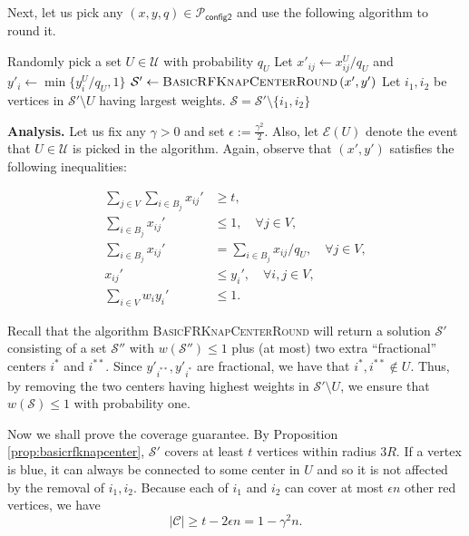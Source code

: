 \documentclass[a4paper,11pt]{article}
\newcommand{\C}{\mathcal{C}}
\renewcommand{\S}{\mathcal{S}}
\newcommand{\U}{\mathcal{U}}
\renewcommand{\P}{\mathcal{P}}
\newcommand{\e}{\mathcal{E}}
\begin{document}
Next, let us pick any $(x,y,q) \in \P_\textsf{config2}$ and use the following algorithm to round it. 

\begin{algorithm}[h]
\caption{$\textsc{FRKnapCenterRound2}\left(x,y,q \right)$}
\begin{algorithmic}[1]
\STATE Randomly pick a set $U \in \U$ with probability $q_U$
\STATE Let $x'_{ij} \gets x^{U}_{ij}/q_U$ and $y'_i \gets \min\{y_i^U/q_U, 1\}$
\STATE $\S' \gets \textsc{BasicRFKnapCenterRound}\left(x', y' \right)$
\STATE Let $i_1, i_2$ be vertices in $\S' \setminus U$ having largest weights.
\RETURN $\S = \S' \setminus \{i_1, i_2\}$
\end{algorithmic} 
\end{algorithm}

\bigskip \noindent \textbf{Analysis.} Let us fix any $\gamma > 0$ and set $\epsilon := \frac{\gamma^2}{2}$. Also, let $\e(U)$ denote the event that $U \in \U$ is picked in the algorithm. Again, observe that $(x', y')$ satisfies the following inequalities:

\begin{align*}
	\sum_{j \in V} \sum_{i \in B_j} x_{ij}' &\geq t, \\
	\sum_{i \in B_j} x_{ij}' &\leq 1, \quad \forall j \in V, \\
	\sum_{i \in B_j} x_{ij}' &= \sum_{i \in B_j} x_{ij} / q_U, \quad  \forall j \in V, \\
	x_{ij}' &\leq y_i', \quad \forall i,j \in V, \\
	\sum_{i \in V} w_iy_i' &\leq 1.
\end{align*}


Recall that the algorithm \textsc{BasicFRKnapCenterRound} will return a solution $\S'$ consisting of a set $\S''$ with $w(\S'') \leq 1$ plus (at most) two extra ``fractional'' centers $i^*$ and $i^{**}$. Since $y'_{i^{**}}, y'_{i^*}$ are  fractional, we have that $i^*, i^{**} \notin U$. Thus, by removing the two centers having highest weights in $\S' \setminus U$, we ensure that $w(\S) \leq 1$ with probability one.

Now we shall prove the coverage guarantee. By Proposition \ref{prop:basicrfknapcenter}, $\S'$ covers at least $t$ vertices within radius $3R$. If a vertex is blue, it can always be connected to some center in $U$ and so it is not affected by the removal of $i_1, i_2$. Because each of $i_1$ and $i_2$ can cover at most $\epsilon n$ other red vertices, we have 
$$|\C| \geq t - 2\epsilon n = 1 - \gamma^2 n.$$
\end{document}
